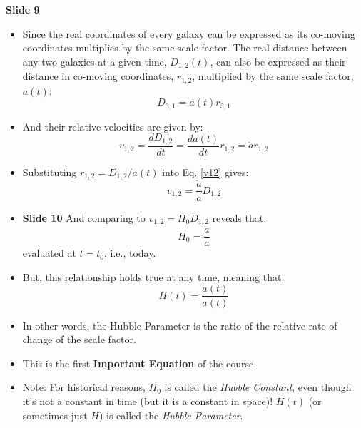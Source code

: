 \documentclass[11pt]{article}
\begin{document}
\vspace{3mm}
\noindent
{\bf Slide 9}
\begin{itemize}
\item Since the real coordinates of every galaxy can be expressed as its co-moving coordinates multiplies by the same scale factor. The real distance between any two galaxies at a given time, $D_{1,2}(t)$, can also be expressed as their distance in co-moving coordinates, $r_{1,2}$,  multiplied by the same scale factor, $a(t)$:
\begin{equation}
D_{3,1} = a(t)r_{3,1}
\end{equation}
\item And their relative velocities are given by:
\begin{equation}
  \label{v12}
  v_{1,2} = \frac{dD_{1,2}}{dt} = \frac{da(t)}{dt}r_{1,2} = \dot{a}r_{1,2}
\end{equation}
\item Substituting $r_{1,2} = D_{1,2}/a(t)$ into Eq. \ref{v12} gives: 
\begin{equation}
  v_{1,2} = \frac{\dot{a}}{a}D_{1,2}
\end{equation}
\item {\bf Slide 10} And comparing to $v_{1,2}=H_0D_{1,2}$ reveals that: 
\begin{equation}
  H_0 = \frac{\dot{a}}{a}
\end{equation}
evaluated at $t=t_0$, i.e., today.
\item But, this relationship holds true at any time, meaning that:
\begin{equation}
  H(t) = \frac{\dot{a}(t)}{a(t)}
\end{equation}
\item In other words, the Hubble Parameter is the ratio of the relative rate of change of the scale factor.
\item This is the first {\bf Important Equation} of the course.
\item Note: For historical reasons, $H_0$ is called the {\it Hubble Constant}, even though it's not a constant in time (but it is a constant in space)! $H(t)$ (or sometimes just $H$) is called the {\it Hubble Parameter}.  
\end{itemize}
\end{document}
